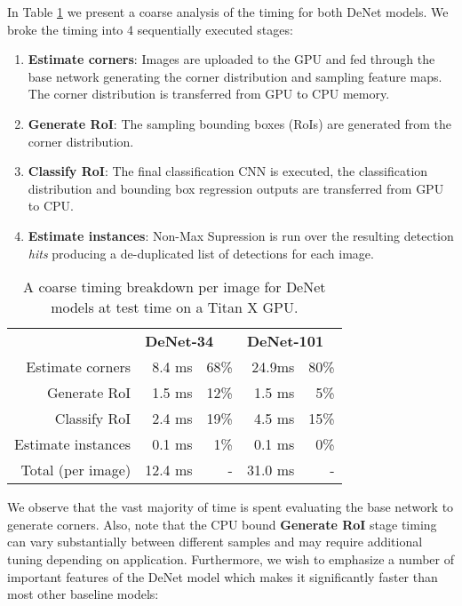 \documentclass[10pt,twocolumn]{article}
\begin{document}
In Table \ref{table:timing_breakdown} we present a coarse analysis of the timing for both DeNet models. We broke the timing into 4 sequentially executed stages:
\begin{enumerate}
\item \textbf{Estimate corners}: Images are uploaded to the GPU and fed through the base network generating the corner distribution and sampling feature maps. The corner distribution is transferred from GPU to CPU memory. 
\item \textbf{Generate RoI}: The sampling bounding boxes (RoIs) are generated from the corner distribution. \item \textbf{Classify RoI}: The final classification CNN is executed, the classification distribution and bounding box regression outputs are transferred from GPU to CPU. 
\item \textbf{Estimate instances}: Non-Max Supression is run over the resulting detection \textit{hits} producing a de-duplicated list of detections for each image. 
\end{enumerate}

\begin{table}[tb]
\begin{center}
\begin{tabular}{rrrrr}
 & \multicolumn{2}{l}{\textbf{DeNet-34}} & \multicolumn{2}{l}{\textbf{DeNet-101}}\\
Estimate corners& 8.4 ms & 68\% & 24.9ms & 80\%  \\
Generate RoI & 1.5 ms & 12\% & 1.5 ms & 5\% \\
Classify RoI & 2.4 ms & 19\% & 4.5 ms & 15\% \\
Estimate instances & 0.1 ms & 1\% & 0.1 ms & 0\% \\
\hline
Total (per image) & 12.4 ms & - & 31.0 ms & - \\
\end{tabular}
\end{center}
\caption{A coarse timing breakdown per image for DeNet models at test time on a Titan X GPU.}
\label{table:timing_breakdown}
\end{table}

We observe that the vast majority of time is spent evaluating the base network to generate corners. Also, note that the CPU bound \textbf{Generate RoI} stage timing can vary substantially between different samples and may require additional tuning depending on application. Furthermore, we wish to emphasize a number of important features of the DeNet model which makes it significantly faster than most other baseline models: 
\end{document}
